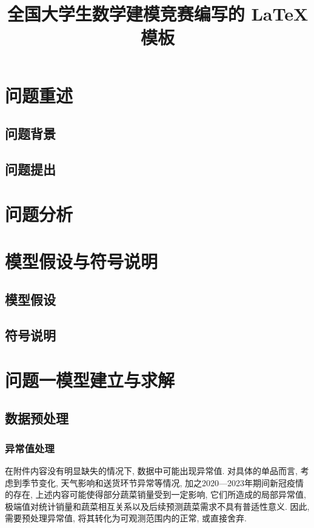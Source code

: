 \documentclass{cumcmthesis}
\title{全国大学生数学建模竞赛编写的 \LaTeX{} 模板}
\begin{document}
 \maketitle
 \begin{abstract}%

\end{abstract}



\section{问题重述}%
\subsection{问题背景}
\subsection{问题提出}
\section{问题分析}%
\section{模型假设与符号说明}%
\subsection{模型假设}
\subsection{符号说明}
\section{问题一模型建立与求解}%

\subsection{数据预处理}

\subsubsection{异常值处理}
在附件内容没有明显缺失的情况下, 数据中可能出现异常值. 对具体的单品而言, 考虑到季节变化, 天气影响和送货环节异常等情况, 加之2020—2023年期间新冠疫情的存在, 上述内容可能使得部分蔬菜销量受到一定影响, 它们所造成的局部异常值, 极端值对统计销量和蔬菜相互关系以及后续预测蔬菜需求不具有普适性意义. 因此, 需要预处理异常值, 将其转化为可观测范围内的正常, 或直接舍弃. 
\end{document}
